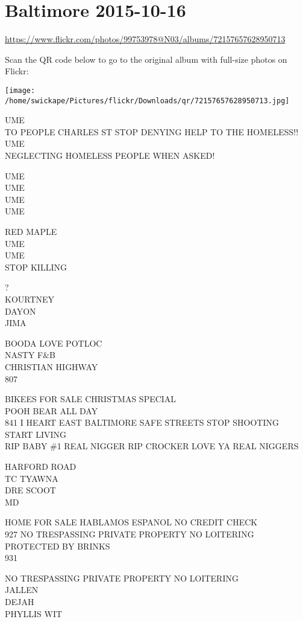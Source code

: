 \documentclass[10pt,letterpaper]{article}
\begin{document}
\section*{Baltimore 2015-10-16}

\url{https://www.flickr.com/photos/99753978@N03/albums/72157657628950713}

Scan the QR code below to go to the original album with full-size photos on Flickr:

\texttt{[image: /home/swickape/Pictures/flickr/Downloads/qr/72157657628950713.jpg]}


UME\\
TO PEOPLE CHARLES ST STOP DENYING HELP TO THE HOMELESS!!\\
UME\\
NEGLECTING HOMELESS PEOPLE WHEN ASKED!

UME\\
UME\\
UME\\
UME

RED MAPLE\\
UME\\
UME\\
STOP KILLING

?\\
KOURTNEY\\
DAYON\\
JIMA

BOODA LOVE POTLOC\\
NASTY F\&B\\
CHRISTIAN HIGHWAY\\
807

BIKEES FOR SALE CHRISTMAS SPECIAL\\
POOH BEAR ALL DAY\\
841 I HEART EAST BALTIMORE SAFE STREETS STOP SHOOTING START LIVING\\
RIP BABY \#1  REAL NIGGER RIP CROCKER LOVE YA REAL NIGGERS

HARFORD ROAD\\
TC TYAWNA\\
DRE SCOOT\\
MD

HOME FOR SALE HABLAMOS ESPANOL NO CREDIT CHECK\\
927 NO TRESPASSING PRIVATE PROPERTY NO LOITERING\\
PROTECTED BY BRINKS\\
931

NO TRESPASSING PRIVATE PROPERTY NO LOITERING\\
JALLEN\\
DEJAH\\
PHYLLIS WIT
\end{document}
